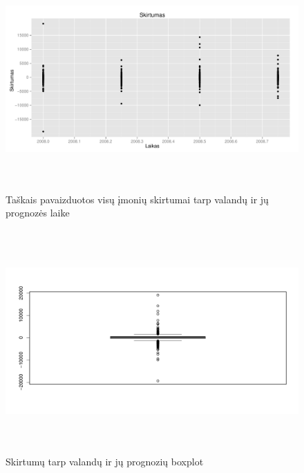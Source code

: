 \documentclass[a4paper]{article}
\begin{document}
\begin{figure}[here]
\includegraphics[height=8.5cm]{Skirtumas_zym.pdf}
\caption{Taškais pavaizduotos visų įmonių skirtumai tarp valandų ir
  jų prognozės laike}
\label{fig:skzym}
\end{figure}

\begin{figure}[here]
\includegraphics[height=8.5cm]{Skirtumas_zym_boxplot.pdf}
\caption{Skirtumų tarp valandų ir jų prognozių boxplot}
\label{fig:skzymb}
\end{figure}
\end{document}
